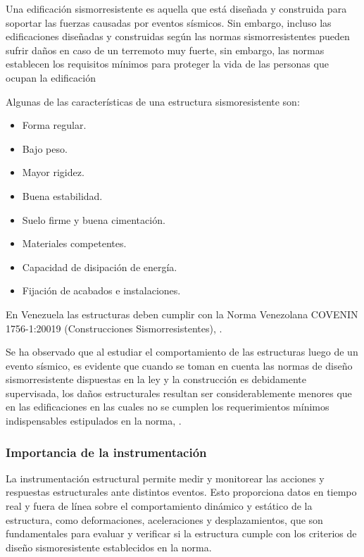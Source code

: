 Una edificación sismorresistente es aquella que está diseñada y construida para soportar las fuerzas causadas por eventos sísmicos. Sin embargo, incluso las edificaciones diseñadas y construidas según las normas sismorresistentes pueden sufrir daños en caso de un terremoto muy fuerte, sin embargo, las normas establecen los requisitos mínimos para proteger la vida de
las personas que ocupan la edificación

Algunas de las características de una estructura sismoresistente son:

        \begin{itemize}
            \item Forma regular.
            \item Bajo peso.
            \item Mayor rigidez.
            \item Buena estabilidad.
            \item Suelo firme y buena cimentación.
            \item Materiales competentes.
            \item Capacidad de disipación de energía.
            \item Fijación de acabados e instalaciones.
        \end{itemize}

En Venezuela las estructuras deben cumplir con la Norma Venezolana COVENIN 1756-1:20019 (Construcciones Sismorresistentes), \citep{covenin}.

Se ha observado que al estudiar el comportamiento de las estructuras luego de un evento sísmico, es evidente que cuando se toman en cuenta las normas de diseño sismorresistente dispuestas en la ley y la construcción es debidamente supervisada, los daños estructurales resultan ser considerablemente menores que en las edificaciones en las cuales no se cumplen los requerimientos mínimos indispensables estipulados en la norma, \citep{blanco2012criterios}.

\subsubsection{Importancia de la instrumentación} La instrumentación estructural permite medir y monitorear las acciones y respuestas estructurales ante distintos eventos. Esto proporciona datos en tiempo real y fuera de línea sobre el comportamiento dinámico y estático de la estructura, como deformaciones, aceleraciones y desplazamientos, que son fundamentales para evaluar y verificar si la estructura cumple con los criterios de diseño sismoresistente establecidos en la norma.

